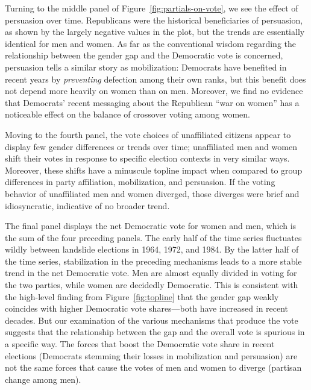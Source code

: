 \documentclass[12pt
               ,final
               ]{article}
\begin{document}
Turning to the middle panel of Figure~\ref{fig:partials-on-vote}, we see the effect of persuasion over time. Republicans were the historical beneficiaries of persuasion, as shown by the largely negative values in the plot, but the trends are essentially identical for men and women. As far as the conventional wisdom regarding the relationship between the gender gap and the Democratic vote is concerned, persuasion tells a similar story as mobilization: Democrats have benefited in recent years by \emph{preventing} defection among their own ranks, but this benefit does not depend more heavily on women than on men. Moreover, we find no evidence that Democrats' recent messaging about the Republican ``war on women'' has a noticeable effect on the balance of crossover voting among women.

Moving to the fourth panel, the vote choices of unaffiliated citizens appear to display few gender differences or trends over time; unaffiliated men and women shift their votes in response to specific election contexts in very similar ways. Moreover, these shifts have a minuscule topline impact when compared to group differences in party affiliation, mobilization, and persuasion. If the voting behavior of unaffiliated men and women diverged, those diverges were brief and idiosyncratic, indicative of no broader trend. 

The final panel displays the net Democratic vote for women and men, which is the sum of the four preceding panels. The early half of the time series fluctuates wildly between landslide elections in 1964, 1972, and 1984. By the latter half of the time series, stabilization in the preceding mechanisms leads to a more stable trend in the net Democratic vote. Men are almost equally divided in voting for the two parties, while women are decidedly Democratic. This is consistent with the high-level finding from Figure~\ref{fig:topline} that the gender gap weakly coincides with higher Democratic vote shares---both have increased in recent decades. But our examination of the various mechanisms that produce the vote suggests that the relationship between the gap and the overall vote is spurious in a specific way. The forces that boost the Democratic vote share in recent elections (Democrats stemming their losses in mobilization and persuasion) are not the same forces that cause the votes of men and women to diverge (partisan change among men).
\end{document}
